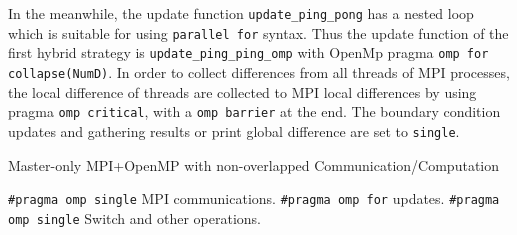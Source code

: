 In the meanwhile, the update function \texttt{update\_ping\_pong} has a nested loop which is suitable for using \texttt{parallel for} syntax.
Thus the update function of the first hybrid strategy is \texttt{update\_ping\_ping\_omp} with OpenMp pragma 
\texttt{omp for collapse(NumD)}.
In order to collect differences from all threads of MPI processes, the local difference of threads are collected to MPI local differences
by using pragma \texttt{omp critical}, with a \texttt{omp barrier} at the end.
The boundary condition updates and gathering results or print global difference are set to \texttt{single}.
\begin{algorithm}
  \caption{Master-only MPI+OpenMP with non-overlapped Communication/Computation}
  \label{ALG:Hybrid_0}
  \begin{algorithmic}[1]
      \STATE \texttt{\#pragma omp single}
      \STATE MPI communications.
        \STATE \texttt{\#pragma omp for} updates.
      \ENDFOR
      \STATE \texttt{\#pragma omp single} Switch and other operations.
    \ENDFOR
  \end{algorithmic}
\end{algorithm}




